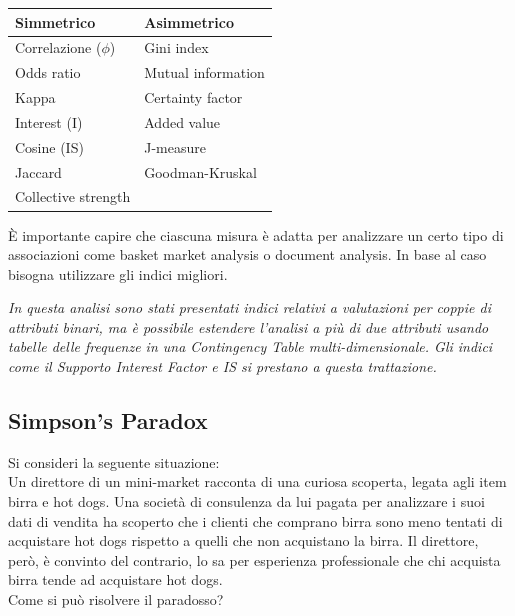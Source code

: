 \begin{table}[H]
	\centering
	\begin{tabular}{|p{5cm}|p{5cm}|}
		\hline
		Simmetrico & Asimmetrico \\
		\hline
		Correlazione ($\phi$) & Gini index \\
		Odds ratio & Mutual information \\
		Kappa & Certainty factor \\
		Interest (I) & Added value \\
		Cosine (IS) & J-measure \\
		Jaccard & Goodman-Kruskal \\
		Collective strength & \\
		\hline
	\end{tabular}
\end{table}

È importante capire che ciascuna misura è adatta per analizzare un certo tipo di associazioni come basket market analysis o document analysis. In base al caso bisogna utilizzare gli indici migliori.

\textit{In questa analisi sono stati presentati indici relativi a valutazioni per coppie di attributi binari, ma è possibile estendere l'analisi a più di due attributi usando tabelle delle frequenze in una Contingency Table multi-dimensionale. Gli indici come il Supporto Interest Factor e IS si prestano a questa trattazione.}

\subsection{Simpson's Paradox}

Si consideri la seguente situazione:
\\Un direttore di un mini-market racconta di una curiosa scoperta, legata agli item birra e hot dogs. Una società di consulenza da lui pagata per analizzare i suoi dati di vendita ha scoperto che i clienti che comprano birra sono meno tentati di acquistare hot dogs rispetto a quelli che non acquistano la birra. Il direttore, però, è convinto del contrario, lo sa per esperienza professionale che chi acquista birra tende ad acquistare hot dogs.
\\Come si può risolvere il paradosso?


